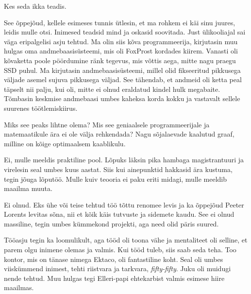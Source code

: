 
Kes seda ikka teadis. 


See õppejõud, kellele esimeses tunnis ütlesin, et 
ma rohkem ei käi sinu juures, leidis mulle otsi. Inimesed 
teadsid mind ja oskasid soovitada. Just ülikooliajal sai väga 
eripalgelisi asju tehtud. Ma olin siis kõva programmeerija, kirjutasin muu hulgas 
oma andmebaasisüsteemi, mis oli FoxProst kordades kiirem. Vanasti oli 
kõvaketta poole pöördumine ränk tegevus, mis võttis 
aega, mitte nagu praegu SSD puhul. Ma kirjutasin andmebaasisüsteemi, millel olid 
fikseeritud pikkusega väljade asemel sujuva pikkusega väljad. See tähendab, et andmeid oli ketta peal täpselt nii palju, kui oli, mitte ei 
olnud eraldatud kindel hulk megabaite. Tõmbasin
keskmise andmebaasi umbes kaheksa korda kokku ja vastavalt sellele suurenes 
töötlemiskiirus.


Miks see peaks lihtne olema? Mis see geniaalsele programmeerijale ja 
matemaatikule ära ei ole välja rehkendada? Nagu sõjalaevade kaalutud 
graaf, milline on kõige optimaalsem kaablikulu. 


Ei, mulle meeldis praktiline pool. Lõpuks läksin pika hambaga 
magistrantuuri ja virelesin seal umbes kuus aastat. Siis kui
ainepunktid hakkasid ära kustuma, tegin jõuga lõputöö. Mulle kuiv teooria ei paku 
eriti midagi, mulle meeldib maailma muuta. 


Ei olnud. Eks ühe või teise tehtud töö tõttu renomee levis ja ka õppejõud
Peeter Lorents levitas sõna, nii et kõik käis
tutvuste ja sidemete kaudu. See ei olnud massiline, tegin umbes kümmekond projekti, aga need olid päris suured.

Tööasju tegin ka loomulikult, aga tööd oli toona vähe 
ja mentaliteet oli selline, et parem olgu inimene olemas ja valmis. Kui tööd 
tuleb, siis saab seda teha. Too kontor, mis on tänase nimega 
Ektaco, oli fantastiline koht. Seal oli umbes 
viiskümmend inimest, tehti riistvara ja tarkvara, \emph{fifty-fifty}. 
Juku oli muidugi nende tehtud. Muu hulgas tegi Elleri-papi 
ehtekarbist valmis esimese hiire maailmas.

